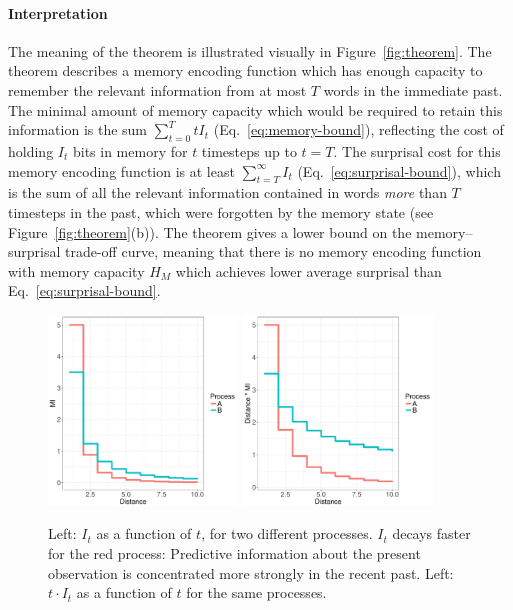 \paragraph{Interpretation} The meaning of the theorem is illustrated visually in Figure~\ref{fig:theorem}. The theorem describes a memory encoding function which has enough capacity to remember the relevant information from at most $T$ words in the immediate past. The minimal amount of memory capacity which would be required to retain this information is the sum $\sum_{t=0}^T t I_t$ (Eq.~\ref{eq:memory-bound}), reflecting the cost of holding $I_t$ bits in memory for $t$ timesteps up to $t=T$. The surprisal cost for this memory encoding function is at least $\sum_{t=T}^\infty I_t$ (Eq.~\ref{eq:surprisal-bound}), which is the sum of all the relevant information contained in words \emph{more} than $T$ timesteps in the past, which were forgotten by the memory state (see Figure~\ref{fig:theorem}(b)). The theorem gives a lower bound on the memory--surprisal trade-off curve, meaning that there is no memory encoding function with memory capacity $H_M$ which achieves lower average surprisal than Eq.~\ref{eq:surprisal-bound}.

\begin{figure}
\includegraphics[width=0.45\textwidth]{figures/decay.pdf}
\includegraphics[width=0.45\textwidth]{figures/memory.pdf}
%
	\caption{Left: $I_t$ as a function of $t$, for two different processes. $I_t$ decays faster for the red process: Predictive information about the present observation is concentrated more strongly in the recent past. Left: $t \cdot I_t$ as a function of $t$ for the same processes. }\label{fig:basic}
\end{figure}

